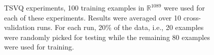 \begin{figure}[h]
\hspace{0.2in}
\caption{TSVQ experiments, 100 training examples in $\mathbb{R}^{1089}$ were used for each of these experiments.  Results were averaged over 10 cross-validation runs.  For each run, 20\% of the data, i.e., 20 examples were randomly picked for testing while the remaining 80 examples were used for training.}
\label{fig:TSVQ_results}
\end{figure}



\clearpage
\newpage
\normalsize







